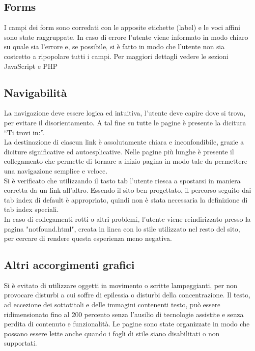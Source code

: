 \documentclass[10pt,a4paper,onecolumn]{article}
\begin{document}
\subsection{Forms}
I campi dei form sono corredati con le apposite etichette (label) e le voci affini sono state raggruppate. In caso di errore l’utente viene informato in modo chiaro su quale sia l’errore e, se possibile, si è fatto in modo che l’utente non sia costretto a ripopolare tutti i campi. Per maggiori dettagli vedere le sezioni JavaScript e PHP

\subsection{Navigabilità}
La navigazione deve essere logica ed intuitiva, l’utente deve capire dove si trova, per evitare il disorientamento. A tal fine su tutte le pagine è presente la dicitura “Ti trovi in:”.\\
La destinazione di ciascun link è assolutamente chiara e inconfondibile, grazie a diciture significative ed autoesplicative.
Nelle pagine più lunghe è presente il collegamento che permette di tornare a inizio pagina in
modo tale da permettere una navigazione semplice e veloce.\\
Si è verificato che utilizzando il tasto tab l'utente riesca a spostarsi in maniera corretta da un link all'altro. Essendo il sito ben progettato, il percorso seguito dai tab index di default è appropriato, quindi non è stata necessaria la definizione di tab index speciali.\\
In caso di collegamenti rotti o altri problemi, l'utente viene reindirizzato presso la pagina "notfound.html", creata in linea con lo stile utilizzato nel resto del sito, per cercare di rendere questa esperienza meno negativa.

\subsection{Altri accorgimenti grafici}
Si è evitato di utilizzare oggetti in movimento o scritte lampeggianti, per non provocare disturbi a cui soffre di epilessia o disturbi della concentrazione.
Il testo, ad eccezione dei sottotitoli e delle immagini contenenti testo, può essere ridimensionato fino al 200 percento senza l'ausilio di tecnologie assistite e senza perdita di contenuto e funzionalità.
Le pagine sono state organizzate in modo che possano essere lette anche quando i fogli di stile siano disabilitati o non supportati.
\end{document}
